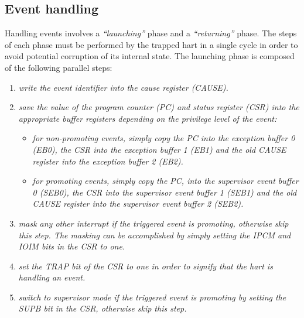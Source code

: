     \subsection{Event handling}

        \vspace{10pt}

        Handling events involves a \textit{``launching''} phase and a \textit{``returning''} phase. The steps of each phase must be performed by the trapped hart in a single cycle in order to avoid potential corruption of its internal state. The launching phase is composed of the following parallel steps:

        \begin{enumerate}

            \item \textit{write the event identifier into the cause register (CAUSE).}

            \item \textit{save the value of the program counter (PC) and status register (CSR) into the appropriate buffer registers depending on the privilege level of the event:}

                \begin{itemize}

                    \item \textit{for non-promoting events, simply copy the PC into the exception buffer 0 (EB0), the CSR into the exception buffer 1 (EB1) and the old CAUSE register into the exception buffer 2 (EB2).}

                    \item \textit{for promoting events, simply copy the PC, into the supervisor event buffer 0 (SEB0), the CSR into the supervisor event buffer 1 (SEB1) and the old CAUSE register into the supervisor event buffer 2 (SEB2).}

                \end{itemize}

            \item \textit{mask any other interrupt if the triggered event is promoting, otherwise skip this step. The masking can be accomplished by simply setting the IPCM and IOIM bits in the CSR to one.}

            \item \textit{set the TRAP bit of the CSR to one in order to signify that the hart is handling an event.}

            \item \textit{switch to supervisor mode if the triggered event is promoting by setting the SUPB bit in the CSR, otherwise skip this step.}


\end{enumerate}
